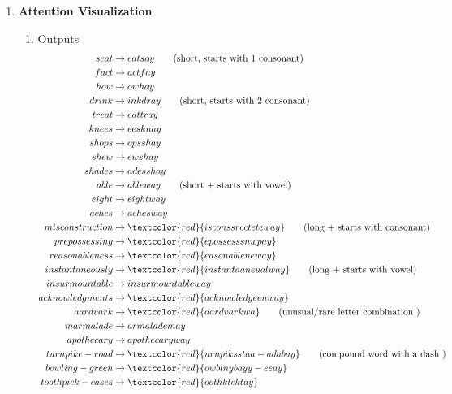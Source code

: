 \documentclass[11pt]{article}
\begin{document}
\begin{enumerate}
\item \textbf{Attention Visualization}
\begin{enumerate}
    \item Outputs 
    \begin{align*}
        seat &\rightarrow eatsay   \tag{short, starts with 1 consonant} \\
        fact &\rightarrow actfay  \\
        how &\rightarrow owhay  \\
        drink &\rightarrow inkdray   \tag{short, starts with 2 consonant}\\
        treat &\rightarrow eattray  \\
        knees &\rightarrow eesknay  \\
        shops &\rightarrow opsshay  \\
        shew &\rightarrow ewshay  \\
        shades &\rightarrow adesshay  \\
        able &\rightarrow ableway  \tag{short + starts with vowel} \\
        eight &\rightarrow eightway  \\
        aches &\rightarrow achesway  \\
        misconstruction &\rightarrow \textcolor{red}{isconssrccteteway} \tag{long + starts with consonant} \\
        prepossessing &\rightarrow \textcolor{red}{epossesssnwpay}  \\
        reasonableness &\rightarrow \textcolor{red}{easonableneway}  \\
        instantaneously &\rightarrow \textcolor{red}{instantaaneualway}  \tag{long + starts with vowel} \\ 
        insurmountable &\rightarrow insurmountableway  \\
        acknowledgments &\rightarrow \textcolor{red}{acknowledgeenway}  \\
        aardvark &\rightarrow \textcolor{red}{aardvarkwa}  \tag{unusual/rare letter combination } \\
        marmalade &\rightarrow armalademay  \\
        apothecary &\rightarrow apothecaryway  \\
        turnpike-road &\rightarrow \textcolor{red}{urnpiksstaa-adabay} \tag{compound word with a dash } \\
        bowling-green &\rightarrow \textcolor{red}{owblnybayy-eeay}  \\
        toothpick-cases &\rightarrow \textcolor{red}{oothktcktay}  \\
    \end{align*}


\end{enumerate}
\end{enumerate}
\end{document}
